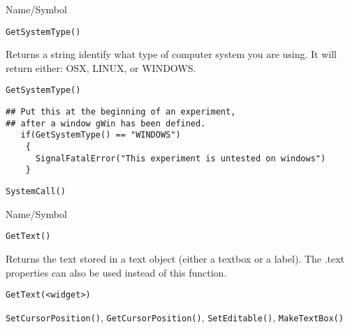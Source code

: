 \begin{desc}{Name/Symbol}
\item[Name/Symbol]	\verb+GetSystemType()+

\item[Description]	Returns a string identify what type of computer system you are using. It will return either: OSX, LINUX, or WINDOWS.

\item[Usage]
\begin{verbatim}
GetSystemType()
\end{verbatim}

\item[Example]

\begin{verbatim}
## Put this at the beginning of an experiment, 
## after a window gWin has been defined.
   if(GetSystemType() == "WINDOWS")
    {
      SignalFatalError("This experiment is untested on windows")
    }

\end{verbatim}

\item[See Also]
  \verb+SystemCall()+
\end{desc}


\rl


\begin{desc}{Name/Symbol}
\item[Name/Symbol]	\verb+GetText()+

\item[Description]	Returns the text stored in a text object 
		(either a textbox or a label).  The .text properties can also
  be used instead of this function.

\item[Usage]
\begin{verbatim}
GetText(<widget>)
\end{verbatim}

\item[Example]	

\item[See Also]	\verb+SetCursorPosition()+, \verb+GetCursorPosition()+, \verb+SetEditable()+, \verb+MakeTextBox()+
\end{desc}

\rl



